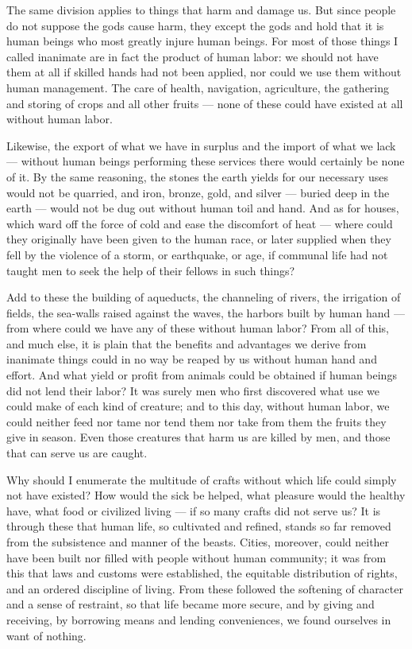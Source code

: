  The same division applies to things that harm and damage us. But since people do not suppose the gods cause harm, they except the gods and hold that it is human beings who most greatly injure human beings. For most of those things I called inanimate are in fact the product of human labor: we should not have them at all if skilled hands had not been applied, nor could we use them without human management. The care of health, navigation, agriculture, the gathering and storing of crops and all other fruits — none of these could have existed at all without human labor.

 Likewise, the export of what we have in surplus and the import of what we lack — without human beings performing these services there would certainly be none of it. By the same reasoning, the stones the earth yields for our necessary uses would not be quarried, and iron, bronze, gold, and silver — buried deep in the earth — would not be dug out without human toil and hand. And as for houses, which ward off the force of cold and ease the discomfort of heat — where could they originally have been given to the human race, or later supplied when they fell by the violence of a storm, or earthquake, or age, if communal life had not taught men to seek the help of their fellows in such things?

 Add to these the building of aqueducts, the channeling of rivers, the irrigation of fields, the sea-walls raised against the waves, the harbors built by human hand — from where could we have any of these without human labor? From all of this, and much else, it is plain that the benefits and advantages we derive from inanimate things could in no way be reaped by us without human hand and effort. And what yield or profit from animals could be obtained if human beings did not lend their labor? It was surely men who first discovered what use we could make of each kind of creature; and to this day, without human labor, we could neither feed nor tame nor tend them nor take from them the fruits they give in season. Even those creatures that harm us are killed by men, and those that can serve us are caught.

 Why should I enumerate the multitude of crafts without which life could simply not have existed? How would the sick be helped, what pleasure would the healthy have, what food or civilized living — if so many crafts did not serve us? It is through these that human life, so cultivated and refined, stands so far removed from the subsistence and manner of the beasts. Cities, moreover, could neither have been built nor filled with people without human community; it was from this that laws and customs were established, the equitable distribution of rights, and an ordered discipline of living. From these followed the softening of character and a sense of restraint, so that life became more secure, and by giving and receiving, by borrowing means and lending conveniences, we found ourselves in want of nothing.

